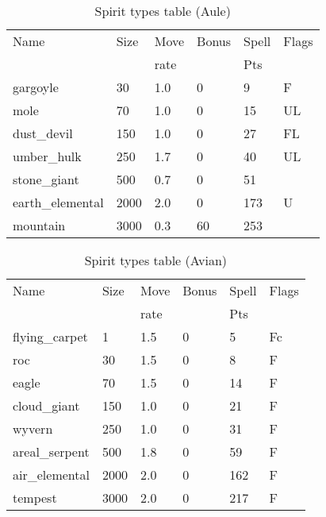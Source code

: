 \begin{same}
\begin{table}[hbpt]
\caption{Spirit types table (Aule)}
\begin{tabular}{ || l | l | l | l | l | l || }
\hline
Name            & Size &Move&Bonus&Spell&Flags\\
                &      &rate&     &Pts  &\\
\hline
gargoyle        &   30 & 1.0&   0 &   9 &F\\
mole            &   70 & 1.0&   0 &  15 &UL\\
dust_devil      &  150 & 1.0&   0 &  27 &FL\\
umber_hulk      &  250 & 1.7&   0 &  40 &UL\\
stone_giant     &  500 & 0.7&   0 &  51 &\\
earth_elemental & 2000 & 2.0&   0 &  173 &U\\
mountain        & 3000 & 0.3&  60 &  253 &\\
\hline
\end{tabular}
\end{table}
\end{same}
\begin{same}
\begin{table}[hbpt]
\caption{Spirit types table (Avian)}
\begin{tabular}{ || l | l | l | l | l | l || }
\hline
Name            & Size &Move&Bonus&Spell&Flags\\
                &      &rate&     &Pts  &\\
\hline
flying_carpet   &    1 & 1.5&   0 &   5 &Fc\\
roc             &   30 & 1.5&   0 &   8 &F\\
eagle           &   70 & 1.5&   0 &  14 &F\\
cloud_giant     &  150 & 1.0&   0 &  21 &F\\
wyvern          &  250 & 1.0&   0 &  31 &F\\
areal_serpent   &  500 & 1.8&   0 &  59 &F\\
air_elemental   & 2000 & 2.0&   0 &  162 &F\\
tempest         & 3000 & 2.0&   0 &  217 &F\\
\hline
\end{tabular}
\end{table}
\end{same}
